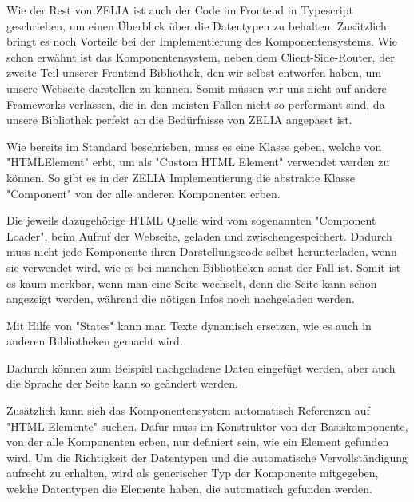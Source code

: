 


Wie der Rest von ZELIA ist auch der Code im Frontend in Typescript geschrieben, um einen Überblick über die Datentypen zu behalten. Zusätzlich bringt es noch Vorteile bei der Implementierung des Komponentensystems. Wie schon erwähnt ist das Komponentensystem, neben dem Client-Side-Router, der zweite Teil unserer Frontend Bibliothek, den wir selbst entworfen haben, um unsere Webseite darstellen zu können. Somit müssen wir uns nicht auf andere Frameworks verlassen, die in den meisten Fällen nicht so performant sind, da unsere Bibliothek perfekt an die Bedürfnisse von ZELIA angepasst ist.


Wie bereits im Standard beschrieben, muss es eine Klasse geben, welche von "HTMLElement" erbt, um als "Custom HTML Element" verwendet werden zu können. So gibt es in der ZELIA Implementierung die abstrakte Klasse "Component" von der alle anderen Komponenten erben.


Die jeweils dazugehörige HTML Quelle wird vom sogenannten "Component Loader", beim Aufruf der Webseite, geladen und zwischengespeichert. Dadurch muss nicht jede Komponente ihren Darstellungscode selbst herunterladen, wenn sie verwendet wird, wie es bei manchen Bibliotheken sonst der Fall ist. Somit ist es kaum merkbar, wenn man eine Seite wechselt, denn die Seite kann schon angezeigt werden, während die nötigen Infos noch nachgeladen werden.

Mit Hilfe von "States" kann man Texte dynamisch ersetzen, wie es auch in anderen Bibliotheken gemacht wird.



Dadurch können zum Beispiel nachgeladene Daten eingefügt werden, aber auch die Sprache der Seite kann so geändert werden.

Zusätzlich kann sich das Komponentensystem automatisch Referenzen auf "HTML Elemente" suchen. Dafür muss im Konstruktor von der Basiskomponente, von der alle Komponenten erben, nur definiert sein, wie ein Element gefunden wird. Um die Richtigkeit der Datentypen und die automatische Vervollständigung aufrecht zu erhalten, wird als generischer Typ der Komponente mitgegeben, welche Datentypen die Elemente haben, die automatisch gefunden werden.

